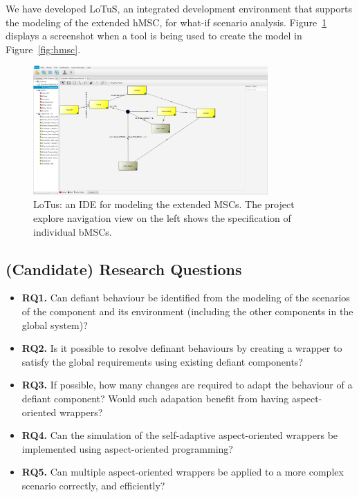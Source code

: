 We have developed LoTuS, an integrated development environment that supports the modeling of the extended hMSC, for what-if scenario analysis.
Figure~\ref{fig:lotus} displays a screenshot when a tool is being used to create the model in Figure~\ref{fig:hmsc}.
\begin{figure}
 \includegraphics[width=0.8\textwidth]{figures/2-LoTuS.png}
    \caption{LoTus: an IDE for modeling the extended MSCs. The project explore navigation view on the left shows the specification of individual bMSCs. }
    \label{fig:lotus}
    \vspace*{-0.25cm}
\end{figure}

\subsection{(Candidate) Research Questions}

\begin{itemize}
\item {\bf RQ1.} Can defiant behaviour be identified from the modeling of the scenarios of the component and its environment (including the  other components in the global system)? 

\item {\bf RQ2.} Is it possible to resolve definant behaviours by creating a wrapper to satisfy the global requirements using existing defiant components?

\item {\bf RQ3.} If possible, how many changes are required to adapt the behaviour of a defiant component? Would such adapation benefit from having aspect-oriented wrappers?

\item {\bf RQ4.} Can the simulation of the self-adaptive aspect-oriented wrappers be implemented using aspect-oriented programming?

\item {\bf RQ5.} Can multiple aspect-oriented wrappers be applied to a more complex scenario correctly, and efficiently? 
\end{itemize}

